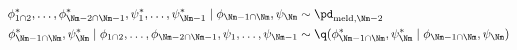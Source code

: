 \begin{align}
  \phi_{1 \cap 2}^{*}, \ldots, \phi_{\Nm - 2 \cap \Nm - 1}^{*}, \psi_{1}^{*}, \ldots, \psi_{\Nm - 1}^{*} \mid \phi_{\Nm - 1 \cap \Nm}, \psi_{\Nm} 
    &\sim 
    \pd_{\text{meld}, \Nm - 2}
  \\
  \phi_{\Nm - 1 \cap \Nm}^{*}, \psi_{\Nm}^{*} \mid \phi_{1 \cap 2}, \ldots, \phi_{\Nm - 2 \cap \Nm - 1}, \psi_{1}, \ldots, \psi_{\Nm - 1} 
    &\sim
    \q(\phi_{\Nm - 1 \cap \Nm}^{*}, \psi_{\Nm}^{*} \mid \phi_{\Nm - 1 \cap \Nm}, \psi_{\Nm})
  \label{eqn:stage-Mminus1-gibbs-updates}
\end{align}